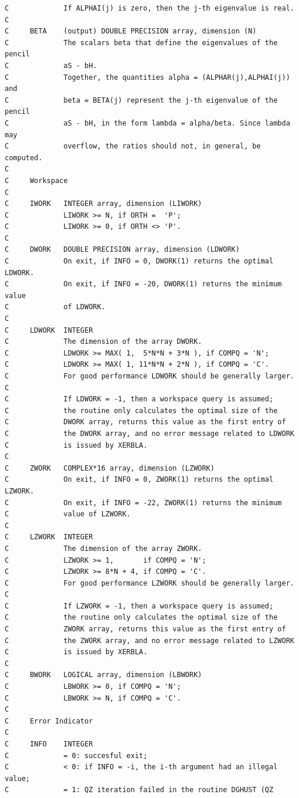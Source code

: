 \documentclass[a4paper,10pt]{article}
\begin{document}
\begin{verbatim}
C             If ALPHAI(j) is zero, then the j-th eigenvalue is real.
C
C     BETA    (output) DOUBLE PRECISION array, dimension (N)
C             The scalars beta that define the eigenvalues of the pencil
C             aS - bH.
C             Together, the quantities alpha = (ALPHAR(j),ALPHAI(j)) and
C             beta = BETA(j) represent the j-th eigenvalue of the pencil
C             aS - bH, in the form lambda = alpha/beta. Since lambda may
C             overflow, the ratios should not, in general, be computed.
C
C     Workspace
C
C     IWORK   INTEGER array, dimension (LIWORK)
C             LIWORK >= N, if ORTH =  'P';
C             LIWORK >= 0, if ORTH <> 'P'.
C
C     DWORK   DOUBLE PRECISION array, dimension (LDWORK)
C             On exit, if INFO = 0, DWORK(1) returns the optimal LDWORK.
C             On exit, if INFO = -20, DWORK(1) returns the minimum value
C             of LDWORK.
C
C     LDWORK  INTEGER
C             The dimension of the array DWORK.
C             LDWORK >= MAX( 1,  5*N*N + 3*N ), if COMPQ = 'N';
C             LDWORK >= MAX( 1, 11*N*N + 2*N ), if COMPQ = 'C'.
C             For good performance LDWORK should be generally larger.
C
C             If LDWORK = -1, then a workspace query is assumed;
C             the routine only calculates the optimal size of the
C             DWORK array, returns this value as the first entry of
C             the DWORK array, and no error message related to LDWORK
C             is issued by XERBLA.
C
C     ZWORK   COMPLEX*16 array, dimension (LZWORK)
C             On exit, if INFO = 0, ZWORK(1) returns the optimal LZWORK.
C             On exit, if INFO = -22, ZWORK(1) returns the minimum
C             value of LZWORK.
C
C     LZWORK  INTEGER
C             The dimension of the array ZWORK.
C             LZWORK >= 1,       if COMPQ = 'N';
C             LZWORK >= 8*N + 4, if COMPQ = 'C'.
C             For good performance LZWORK should be generally larger.
C
C             If LZWORK = -1, then a workspace query is assumed;
C             the routine only calculates the optimal size of the
C             ZWORK array, returns this value as the first entry of
C             the ZWORK array, and no error message related to LZWORK
C             is issued by XERBLA.
C
C     BWORK   LOGICAL array, dimension (LBWORK)
C             LBWORK >= 0, if COMPQ = 'N';
C             LBWORK >= N, if COMPQ = 'C'.
C
C     Error Indicator
C
C     INFO    INTEGER
C             = 0: succesful exit;
C             < 0: if INFO = -i, the i-th argument had an illegal value;
C             = 1: QZ iteration failed in the routine DGHUST (QZ

\end{verbatim}
\end{document}
